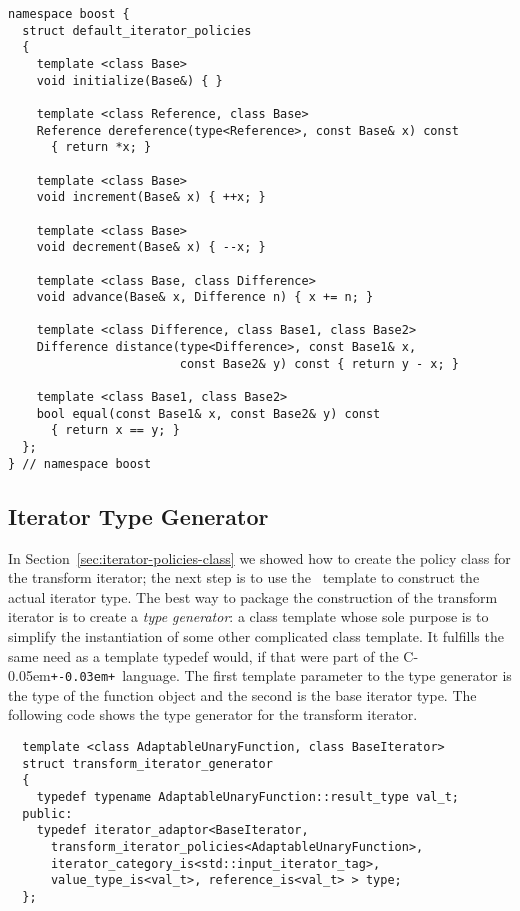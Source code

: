 \documentclass{netobjectdays}
\newcommand{\Cpp}{C\kern-0.05em\texttt{+\kern-0.03em+}}
\newcommand{\iteratoradaptor}{\code{iterator\_\-adaptor}}
\begin{document}
{\footnotesize
\begin{verbatim}
namespace boost {
  struct default_iterator_policies
  {
    template <class Base>
    void initialize(Base&) { }

    template <class Reference, class Base>
    Reference dereference(type<Reference>, const Base& x) const
      { return *x; }

    template <class Base>
    void increment(Base& x) { ++x; }

    template <class Base>
    void decrement(Base& x) { --x; }

    template <class Base, class Difference>
    void advance(Base& x, Difference n) { x += n; }

    template <class Difference, class Base1, class Base2>
    Difference distance(type<Difference>, const Base1& x,
                        const Base2& y) const { return y - x; }

    template <class Base1, class Base2>
    bool equal(const Base1& x, const Base2& y) const
      { return x == y; }
  };
} // namespace boost
\end{verbatim}
}


\subsection{Iterator Type Generator}
\label{sec:iter-type-generator}

In Section~\ref{sec:iterator-policies-class} we showed how to create
the policy class for the transform iterator; the next step is to use
the \iteratoradaptor\ template to construct the actual iterator type.
The best way to package the construction of the transform iterator is
to create a \emph{type generator}: a class template whose sole purpose
is to simplify the instantiation of some other complicated class
template. It fulfills the same need as a template typedef would, if
that were part of the \Cpp\ language.  The first template parameter to
the type generator is the type of the function object and the second
is the base iterator type.  The following code shows the type
generator for the transform iterator.

{\footnotesize
\begin{verbatim}
  template <class AdaptableUnaryFunction, class BaseIterator>
  struct transform_iterator_generator
  {
    typedef typename AdaptableUnaryFunction::result_type val_t;
  public:
    typedef iterator_adaptor<BaseIterator, 
      transform_iterator_policies<AdaptableUnaryFunction>,
      iterator_category_is<std::input_iterator_tag>, 
      value_type_is<val_t>, reference_is<val_t> > type;
  };
\end{verbatim}
}
\end{document}

